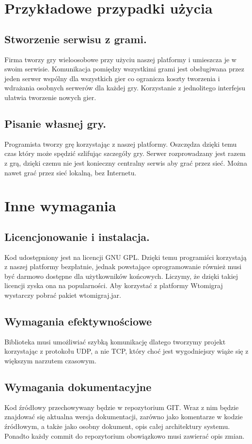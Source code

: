 \documentclass[a4paper, 12pt]{article}
\begin{document}
\section[Przykładowe przypadki użycia]{Przykładowe przypadki użycia}
\subsection{Stworzenie serwisu z grami.} Firma tworzy gry wieloosobowe przy użyciu naszej platformy i umieszcza je w swoim serwisie. Komunikacja pomiędzy wszystkimi grami jest obsługiwana przez jeden serwer wspólny dla wszystkich gier co ogranicza koszty tworzenia i wdrażania osobnych serwerów dla każdej gry. Korzystanie z jednolitego interfejsu ułatwia tworzenie nowych gier.
\subsection{Pisanie własnej gry.} Programista tworzy grę korzystając z naszej platformy. Oszczędza dzięki temu czas który może spędzić szlifując szczegóły gry. Serwer rozprowadzany jest razem z grą, dzięki czemu nie jest konieczny centralny serwis aby grać przez sieć. Można nawet grać przez sieć lokalną, bez Internetu.

\section{Inne wymagania}
\subsection{Licencjonowanie i instalacja.}
Kod udostępniony jest na licencji GNU GPL. Dzięki temu programiści korzystają z naszej platformy bezpłatnie, jednak powstające oprogramowanie również musi być darmowo dostępne dla użytkowników końcowych. Liczymy, że dzięki takiej licencji zyska ona na popularności. Aby korzystać z platformy Wtomigraj wystarczy pobrać pakiet wtomigraj.jar. 


\subsection{Wymagania efektywnościowe}
Biblioteka musi umożliwiać szybką komunikację dlatego tworzymy projekt korzystając z protokołu UDP, a nie TCP, który choć jest wygodniejszy wiąże się z większym narzutem czasowym.

\subsection[Wymagania dokumentacyjne]{Wymagania dokumentacyjne}
Kod źródłowy przechowywany będzie w repozytorium GIT. Wraz z nim będzie znajdować się aktualna wersja dokumentacji, zarówno jako komentarze w kodzie źródłowym, a także jako osobny dokument, opis całej architektury systemu. Ponadto każdy commit do repozytorium obowiązkowo musi zawierać opis zmian.
\end{document}
